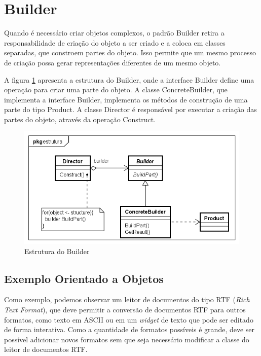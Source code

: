 \section{Builder}

Quando é necessário criar objetos  
complexos, o padrão Builder retira a 
responsabilidade de criação do objeto a 
ser criado e a coloca em classes separadas, 
que constroem partes do objeto. 
Isso permite que um mesmo processo de criação 
possa gerar representações diferentes de um mesmo 
objeto.

A figura \ref{builder_struct} apresenta 
a estrutura do Builder, onde a interface 
Builder define uma operação para criar uma 
parte do objeto. A classe ConcreteBuilder, que 
implementa a interface Builder, 
implementa os métodos de construção de 
uma parte do tipo Product. A classe Director 
é responsável por executar a criação das 
partes do objeto, através da operação 
Construct.

\begin{figure}[htb]
	\caption{\label{builder_struct}Estrutura do Builder}
	\begin{center}
	    \includegraphics[scale=0.5]{5_padroes-contexto-funcional/5.1_criacionais/5.1.3_builder/builder_estrutura.png}
	\end{center}
\end{figure}

\subsection*{Exemplo Orientado a Objetos}

Como exemplo, podemos observar um leitor de 
documentos do tipo RTF (\textit{Rich Text Format}), 
que deve permitir a conversão de documentos RTF 
para outros formatos, como texto em ASCII ou em um 
\textit{widget} de texto que pode ser editado de 
forma interativa. Como a quantidade de formatos 
possíveis é grande, deve ser possível adicionar 
novos formatos sem que seja necessário modificar 
a classe do leitor de documentos RTF. 

